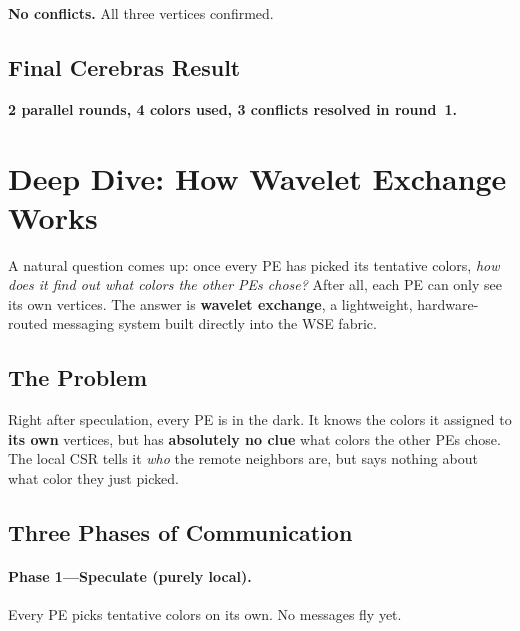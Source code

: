 \documentclass[11pt,letterpaper]{article}
\begin{document}
\noindent\textbf{No conflicts.} All three vertices confirmed.

\subsection{Final Cerebras Result}

\begin{center}
\end{center}

\noindent\textbf{2 parallel rounds, 4 colors used, 3 conflicts resolved in round~1.}

\section{Deep Dive: How Wavelet Exchange Works}
\label{sec:wavelets}

A natural question comes up: once every PE has picked its tentative colors, \emph{how does it find out what colors the other PEs chose?} After all, each PE can only see its own vertices. The answer is \textbf{wavelet exchange}, a lightweight, hardware-routed messaging system built directly into the WSE fabric.

\subsection{The Problem}

Right after speculation, every PE is in the dark. It knows the colors it assigned to \textbf{its own} vertices, but has \textbf{absolutely no clue} what colors the other PEs chose. The local CSR tells it \emph{who} the remote neighbors are, but says nothing about what color they just picked.

\subsection{Three Phases of Communication}

\paragraph{Phase 1---Speculate (purely local).}
Every PE picks tentative colors on its own. No messages fly yet.
\end{document}
